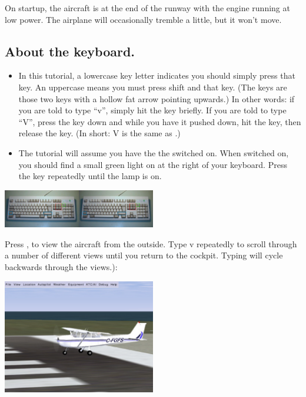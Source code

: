 On startup, the aircraft is at the end of the runway with the engine running 
at low power. The airplane will occasionally tremble a little, but it won't 
move.
    
\subsection*{About the keyboard.}
    
\begin{itemize}
	\item In this tutorial, a lowercase key letter indicates you should simply
  press that key. An uppercase means you must press shift and that key. 
  (The \textcolor{blue}{} keys are those two keys with 
  a hollow fat arrow pointing upwards.) In other words: if you are told to type
  ``v'', simply hit the  key briefly. 
   If you are told to type ``V'', 
  press the  key down and while you have it pushed down, hit the 
   key, then release the   key. (In short: V is the same as 
  .)
	\item The tutorial will assume you have the the  switched on. 
   When switched on, you should find a small green
  light on at the right of your keyboard. Press the 
  \textcolor{green}{}key repeatedly until the lamp is on.
\end{itemize}

\begin{center}
\includegraphics[width=0.5\textwidth]{img/tut_7}
\end{center}

Press , to view the aircraft from the outside. Type v repeatedly to
scroll through a number of different views until you return to the cockpit.
Typing  will cycle backwards through the views.):

\begin{center}
\includegraphics[width=0.5\textwidth]{img/tut_8}
\end{center}

